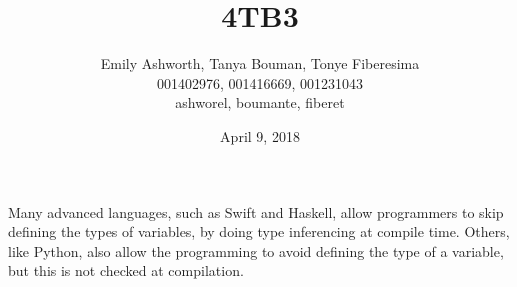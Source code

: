 \documentclass[12pt]{article}
\title{4TB3 }
\author{Emily Ashworth, Tanya Bouman, Tonye Fiberesima \\ 
001402976, 001416669, 001231043 \\ 
ashworel, boumante, fiberet}
\date{April 9, 2018}
\begin{document}
\maketitle

Many advanced languages, such as Swift\cite{swifttypedocs} and Haskell\cite{haskelltypedocs},
allow programmers to skip defining the types of variables,
by doing type inferencing at compile time.
Others, like Python, also allow the programming to avoid defining
the type of a variable, but this is not checked at compilation.  %



\end{document}
